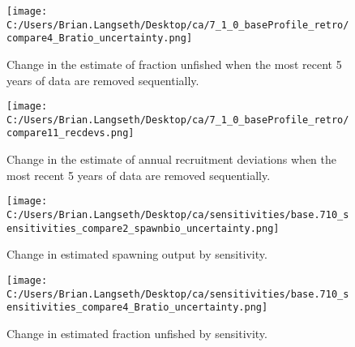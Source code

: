 \documentclass[11pt,
  english,
  a4paper,
]{article}
\begin{document}
\tagmcend\tagstructend


\begin{figure}
\centering
\texttt{[image: C:/Users/Brian.Langseth/Desktop/ca/7\_1\_0\_baseProfile\_retro/compare4\_Bratio\_uncertainty.png]}
\caption{Change in the estimate of fraction unfished when the most recent 5 years of data are removed sequentially.\label{fig:retro-depl}}
\end{figure}

\tagmcend\tagstructend


\begin{figure}
\centering
\texttt{[image: C:/Users/Brian.Langseth/Desktop/ca/7\_1\_0\_baseProfile\_retro/compare11\_recdevs.png]}
\caption{Change in the estimate of annual recruitment deviations when the most recent 5 years of data are removed sequentially.\label{fig:retro-recdevs}}
\end{figure}

\tagmcend\tagstructend


\begin{figure}
\centering
\texttt{[image: C:/Users/Brian.Langseth/Desktop/ca/sensitivities/base.710\_sensitivities\_compare2\_spawnbio\_uncertainty.png]}
\caption{Change in estimated spawning output by sensitivity.\label{fig:sens-ssb}}
\end{figure}

\tagmcend\tagstructend


\begin{figure}
\centering
\texttt{[image: C:/Users/Brian.Langseth/Desktop/ca/sensitivities/base.710\_sensitivities\_compare4\_Bratio\_uncertainty.png]}
\caption{Change in estimated fraction unfished by sensitivity.\label{fig:sens-depl}}
\end{figure}
\end{document}
